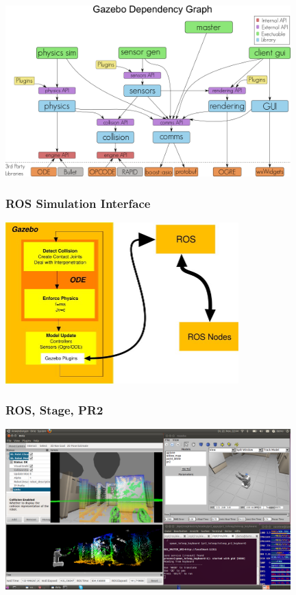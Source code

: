 \begin{frame}
\includegraphics[width=11cm]{img/gazebo_dependency_graph.png}
\end{frame}

\begin{frame}
  \frametitle{ROS Simulation Interface}
\hspace{5ex}\includegraphics[width=9cm]{img/ros_simulation_interface.jpg}
\end{frame}

\begin{frame}
  \frametitle{ROS, Stage, PR2}
\includegraphics[width=11cm]{img/race_pr2_ros_rviz2.png}
\end{frame}
